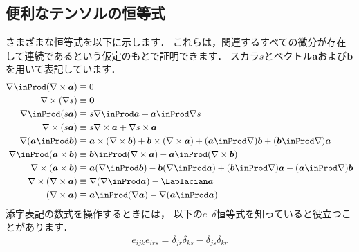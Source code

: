 \subsection{便利なテンソルの恒等式}
\label{ssec:1.3.8}
さまざまな恒等式を以下に示します．
これらは，関連するすべての微分が存在して連続であるという仮定のもとで証明できます．
スカラ$s$とベクトル$\bm{a}$および$\bm{b}$を用いて表記しています．
\begin{align}
 \label{eq:1.29}
 \begin{aligned}
  \nabla \inProd (\nabla \times \bm{a}) &\equiv 0 \\
  \nabla \times (\nabla s) &\equiv \bm{0} \\
  \nabla \inProd (s\bm{a}) &\equiv s\nabla \inProd \bm{a} + \bm{a} \inProd \nabla s \\
  \nabla \times (s\bm{a}) &\equiv s\nabla \times \bm{a} + \nabla s \times \bm{a} \\
  \nabla (\bm{a} \inProd \bm{b})
    &\equiv \bm{a} \times (\nabla \times \bm{b}) + \bm{b} \times (\nabla \times \bm{a})
            + (\bm{a} \inProd \nabla)\bm{b} + (\bm{b} \inProd \nabla)\bm{a} \\
  \nabla \inProd (\bm{a} \times \bm{b})
    &\equiv \bm{b} \inProd (\nabla \times \bm{a}) - \bm{a} \inProd (\nabla \times \bm{b}) \\
  \nabla \times (\bm{a} \times \bm{b})
    &\equiv \bm{a}(\nabla \inProd \bm{b}) - \bm{b}(\nabla \inProd \bm{a})
            + (\bm{b} \inProd \nabla)\bm{a} - (\bm{a} \inProd \nabla)\bm{b} \\
  \nabla \times (\nabla \times \bm{a})
    &\equiv \nabla (\nabla \inProd \bm{a}) - \Laplacian\bm{a} \\
  (\nabla \times \bm{a})
    &\equiv \bm{a} \inProd (\nabla \bm{a}) - \nabla (\bm{a} \inProd \bm{a})
 \end{aligned}
\end{align}
添字表記の数式を操作するときには，
以下の$e$--$\delta$恒等式を知っていると役立つことがあります．
\begin{align}
 \label{eq:1.30}
 e_{ijk}e_{irs} = \delta_{jr}\delta_{ks} - \delta_{js}\delta_{kr}
\end{align}


